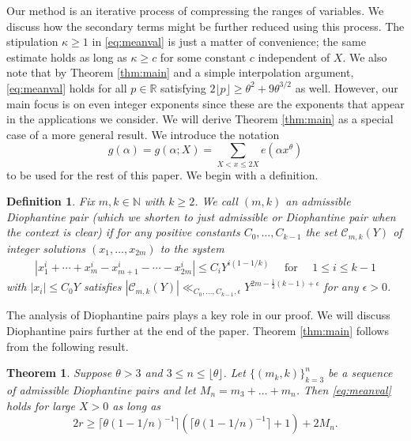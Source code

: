 \documentclass[11pt,reqno]{amsart}
\newtheorem{definition}{Definition}[section]
\numberwithin{equation}{section}
\newtheorem{theorem}{Theorem}[section]
\begin{document}
Our method is an iterative process of compressing the ranges of variables. We discuss how the secondary terms might be further reduced using this process. The stipulation $\kappa \geq 1$ in \eqref{eq:meanval} is just a matter of convenience; the same estimate holds as long as $\kappa \geq c$ for some constant $c$ independent of $X$. We also note that by Theorem \ref{thm:main} and a simple interpolation argument, \eqref{eq:meanval} holds for all $p \in \mathbb{R}$ satisfying $2\lfloor p \rfloor \geq \theta^2+9\theta^{3/2}$ as well. However, our main focus is on even integer exponents since these are the exponents that appear in the applications we consider.  We will derive Theorem \ref{thm:main} as a special case of a more general result. We introduce the notation 
\[ g(\alpha) = g(\alpha;X) = \sum_{X < x \leq 2X} e(\alpha x^{\theta}) \]
to be used for the rest of this paper. We begin with a definition. 

\begin{definition} \label{def:diopair}
Fix $m, k \in \mathbb{N}$ with $k \geq 2$. We call $(m,k)$ an admissible Diophantine pair (which we shorten to just admissible or Diophantine pair when the context is clear) if for any positive constants $C_0, \ldots, C_{k-1}$ the set $\mathcal{C}_{m,k}(Y)$ of integer solutions $(x_1,\ldots,x_{2m})$ to the system 
\begin{align} \label{eq:diopairsystem}
|x_1^i +\cdots+x_{m}^i-x_{m+1}^i-\cdots-x_{2m}^i| \leq C_i Y^{i(1-1/k)} \quad \text{ for } \quad 1 \leq i \leq k-1 
\end{align}
with $|x_i| \leq C_0Y$ 
satisfies $|\mathcal{C}_{m,k}(Y)| \ll_{C_0,\ldots,C_{k-1}, \epsilon} Y^{2m-\frac{1}{2}(k-1)+\epsilon}$ for any $\epsilon > 0$. 
\end{definition} 

The analysis of Diophantine pairs plays a key role in our proof. We will discuss Diophantine pairs further at the end of the paper. Theorem \ref{thm:main} follows from the following result. 
\begin{theorem} \label{thm:general}
Suppose $\theta > 3$ and $3 \leq n \leq \lfloor \theta \rfloor$. Let $\{(m_k,k)\}_{k=3}^{n}$ be a sequence of admissible Diophantine pairs and let $M_n = m_3+\ldots+m_n$. 
Then \eqref{eq:meanval} holds for large $X > 0$ as long as \[ 2r \geq \lceil \theta(1-1/n)^{-1} \rceil(\lceil \theta(1-1/n)^{-1}\rceil+1)+2M_n. \] 
\end{theorem}
\end{document}

